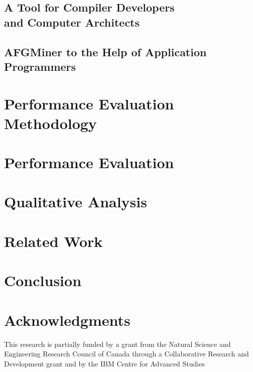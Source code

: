\documentclass{acm_proc_article-sp}
\begin{document}
	\subsection{A Tool for Compiler Developers\\
	                   and Computer Architects}
		\label{sec:HEPMiner}
		
	\subsection{AFGMiner to the Help of Application\\
	                   Programmers}
		\label{sec:SCPMiner}
		
		
\section{Performance Evaluation\\
              Methodology}
	\label{sec:Methodology}
	

\section{Performance Evaluation}
	\label{sec:PerformanceEvaluation}
	
\section{Qualitative Analysis}
        \label{sec:QualAnalysis}
        
\section{Related Work}
	\label{sec:Related}
	

\section*{Conclusion}
	\label{sec:Conclusion}
	

\section{Acknowledgments}
This research is partially funded by a grant from the Natural Science and Engineering Research Council of Canada through a Collaborative Research and Development grant and by the IBM Centre for Advanced Studies


  
\balancecolumns
\end{document}
